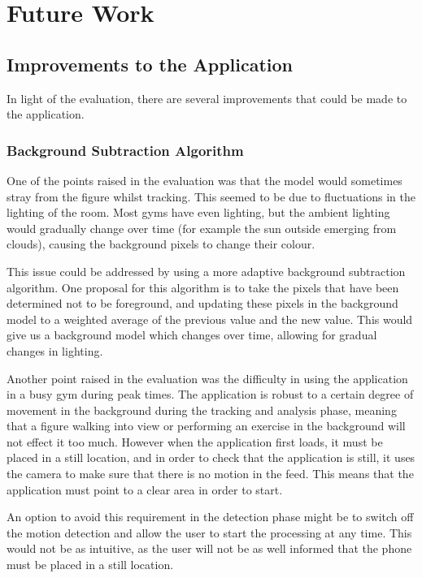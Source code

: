 \section{Future Work}
\label{sec:future}

\subsection{Improvements to the Application}
\label{sec:improvements}

In light of the evaluation, there are several improvements that could be made to the application.

\subsubsection{Background Subtraction Algorithm}

One of the points raised in the evaluation was that the model would sometimes stray from the figure whilst tracking. This seemed to be due to fluctuations in the lighting of the room. Most gyms have even lighting, but the ambient lighting would gradually change over time (for example the sun outside emerging from clouds), causing the background pixels to change their colour.

This issue could be addressed by using a more adaptive background subtraction algorithm. One proposal for this algorithm is to take the pixels that have been determined not to be foreground, and updating these pixels in the background model to a weighted average of the previous value and the new value. This would give us a background model which changes over time, allowing for gradual changes in lighting.

Another point raised in the evaluation was the difficulty in using the application in a busy gym during peak times. The application is robust to a certain degree of movement in the background during the tracking and analysis phase, meaning that a figure walking into view or performing an exercise in the background will not effect it too much. However when the application first loads, it must be placed in a still location, and in order to check that the application is still, it uses the camera to make sure that there is no motion in the feed. This means that the application must point to a clear area in order to start.

An option to avoid this requirement in the detection phase might be to switch off the motion detection and allow the user to start the processing at any time. This would not be as intuitive, as the user will not be as well informed that the phone must be placed in a still location.

